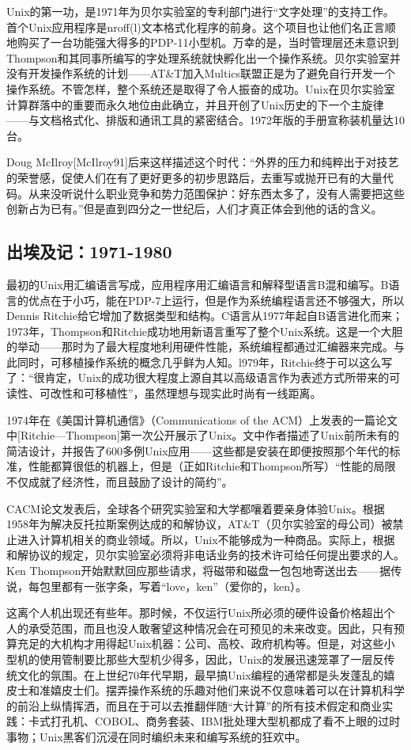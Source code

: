 \documentclass[12pt,oneside]{book}
\begin{document}
\begin{common-format}
Unix的第一功，是1971年为贝尔实验室的专利部门进行“文字处理”的支持工作。首个Unix应用程序是nroff(l)文本格式化程序的前身。这个项目也让他们名正言顺地购买了一台功能强大得多的PDP-11小型机。万幸的是，当时管理层还未意识到Thompson和其同事所编写的字处理系统就快孵化出一个操作系统。贝尔实验室并没有开发操作系统的计划——AT\&{}T加入Multics联盟正是为了避免自行开发一个操作系统。不管怎样，整个系统还是取得了令人振奋的成功。Unix在贝尔实验室计算群落中的重要而永久地位由此确立，并且开创了Unix历史的下一个主旋律——与文档格式化、排版和通讯工具的紧密结合。1972年版的手册宣称装机量达10台。

Doug McIlroy[McIlroy91]后来这样描述这个时代：“外界的压力和纯粹出于对技艺的荣誉感，促使人们在有了更好更多的初步思路后，去重写或抛开已有的大量代码。从来没听说什么职业竞争和势力范围保护：好东西太多了，没有人需要把这些创新占为已有。”但是直到四分之一世纪后，人们才真正体会到他的话的含义。


\subsection{出埃及记：1971-1980}
最初的Unix用汇编语言写成，应用程序用汇编语言和解释型语言B混和编写。B语言的优点在于小巧，能在PDP-7上运行，但是作为系统编程语言还不够强大，所以Dennis Ritchie给它增加了数据类型和结构。C语言从1977年起自B语言进化而来；1973年，Thompson和Ritchie成功地用新语言重写了整个Unix系统。这是一个大胆的举动——那时为了最大程度地利用硬件性能，系统编程都通过汇编器来完成。与此同时，可移植操作系统的概念几乎鲜为人知。l979年，Ritchie终于可以这么写了：“很肯定，Unix的成功很大程度上源自其以高级语言作为表述方式所带来的可读性、可改性和可移植性”，虽然理想与现实此时尚有一线距离。

1974年在《美国计算机通信》（Communications of the ACM）上发表的一篇论文中[Ritchie—Thompson]第一次公开展示了Unix。文中作者描述了Unix前所未有的简洁设计，并报告了600多例Unix应用——这些都是安装在即便按照那个年代的标准，性能都算很低的机器上，但是（正如Ritchie和Thompson所写）“性能的局限不仅成就了经济性，而且鼓励了设计的简约”。

CACM论文发表后，全球各个研究实验室和大学都嚷着要亲身体验Unix。根据1958年为解决反托拉斯案例达成的和解协议，AT\&{}T（贝尔实验室的母公司）被禁止进入计算机相关的商业领域。所以，Unix不能够成为一种商品。实际上，根据和解协议的规定，贝尔实验室必须将非电话业务的技术许可给任何提出要求的人。Ken Thompson开始默默回应那些请求，将磁带和磁盘一包包地寄送出去——据传说，每包里都有一张字条，写着“love，ken”（爱你的，ken）。

这离个人机出现还有些年。那时候，不仅运行Unix所必须的硬件设备价格超出个人的承受范围，而且也没人敢奢望这种情况会在可预见的未来改变。因此，只有预算充足的大机构才用得起Unix机器：公司、高校、政府机构等。但是，对这些小型机的使用管制要比那些大型机少得多，因此，Unix的发展迅速笼罩了一层反传统文化的氛围。在上世纪70年代早期，最早搞Unix编程的通常都是头发蓬乱的嬉皮士和准嬉皮士们。摆弄操作系统的乐趣对他们来说不仅意味着可以在计算机科学的前沿上纵情挥洒，而且在于可以去推翻伴随“大计算”的所有技术假定和商业实践：卡式打孔机、COBOL、商务套装、IBM批处理大型机都成了看不上眼的过时事物；Unix黑客们沉浸在同时编织未来和编写系统的狂欢中。


\end{common-format}
\end{document}
